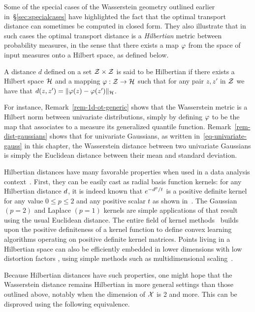Some of the special cases of the Wasserstein geometry outlined earlier in~\S\ref{sec:specialcases} have highlighted the fact that the optimal transport distance can sometimes be computed in closed form. They also illustrate that in such cases the optimal transport distance is a \emph{Hilbertian} metric between probability measures, in the sense that there exists a map $\tphi$ from the space of input measures onto a Hilbert space, as defined below.

\begin{defn}\label{def-Hilbertmetric}
A distance $d$ defined on a set $\mathcal{Z}\times \mathcal{Z}$ is said to be Hilbertian if there exists a Hilbert space $\mathcal{H}$ and a mapping $\tphi:\Z\rightarrow \RKHS$ such that for any pair $z,z'$ in $\mathcal{Z}$ we have that $d(z,z')=\|\tphi(z)-\tphi(z')\|_\RKHS$.
\end{defn}

For instance, Remark~\ref{rem-1d-ot-generic} shows that the Wasserstein metric is a Hilbert norm between univariate distributions, simply by defining $\tphi$ to be the map that associates to a measure its generalized quantile function. Remark~\ref{rem-dist-gaussians} shows that for univariate Gaussians, as written in~\eqref{eq-univariate-gauss} in this chapter, the Wasserstein distance between two univariate Gaussians is simply the Euclidean distance between their mean and standard deviation.

Hilbertian distances have many favorable properties when used in a data analysis context~\citep{dattorro2010convex}. First, they can be easily cast as radial basis function kernels: for any Hilbertian distance $d$, it is indeed known that $e^{-d^p/t}$ is a positive definite kernel for any value $0\leq p\leq 2$ and any positive scalar $t$ as shown in~\citep[Cor. 3.3.3, Prop. 3.2.7]{berg84harmonic}. The Gaussian $(p=2)$ and Laplace $(p=1)$ kernels are simple applications of that result using the usual Euclidean distance. The entire field of kernel methods~\citep{Hofmann2008} builds upon the positive definiteness of a kernel function to define convex learning algorithms operating on positive definite kernel matrices. Points living in a Hilbertian space can also be efficiently embedded in lower dimensions with low distortion factors \citep{Johnson84}, \citep[\S V.6.2]{barvinok2002course} using simple methods such as multidimensional scaling~\citep{borg2005modern}.

Because Hilbertian distances have such properties, one might hope that the Wasserstein distance remains Hilbertian in more general settings than those outlined above, notably when the dimension of $\mathcal{X}$ is 2 and more. This can be disproved using the following equivalence.

